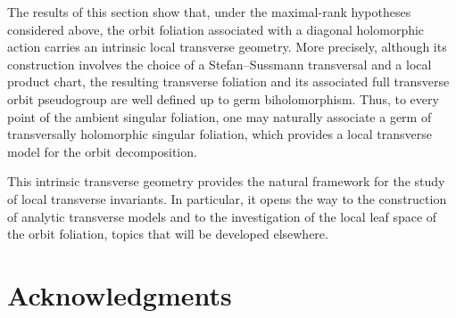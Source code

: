\documentclass[11pt]{amsart}
\theoremstyle{definition}
\theoremstyle{remark}
\newcommand{\leaf}[1]{\mathcal{L}_{#1}}
\begin{document}
%
%
%
%

\bigskip
The results of this section show that, under the maximal-rank hypotheses considered above, the orbit foliation associated with a diagonal holomorphic action carries an intrinsic local transverse geometry.
More precisely, although its construction involves the choice of a Stefan--Sussmann transversal and a local product chart, the resulting transverse foliation and its associated full transverse orbit pseudogroup are well defined up to germ biholomorphism.
Thus, to every point of the ambient singular foliation, one may naturally associate a germ of transversally holomorphic singular foliation, which provides a local transverse model for the orbit decomposition.

This intrinsic transverse geometry provides the natural framework for the study of local transverse invariants.
In particular, it opens the way to the construction of analytic transverse models and to the investigation of the local leaf space of the orbit foliation, topics that will be developed elsewhere.

\section*{Acknowledgments}
\end{document}
